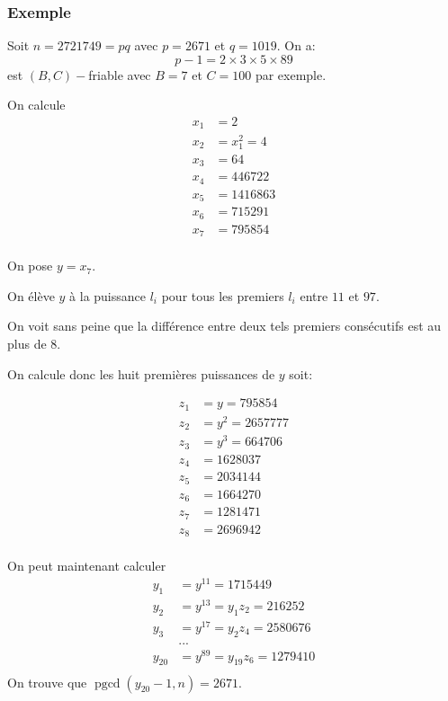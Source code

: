 \documentclass[french, 12pt, titlepage]{article}
\DeclareMathOperator{\pgcd}{pgcd}
\begin{document}
\subsubsection{Exemple}

Soit $n = 2721749 = pq$ avec $p = 2671$ et $q = 1019$. On a: \[p - 1 = 2 \times 3 \times 5 \times 89\] est $(B, C)-$friable avec $B = 7$ et $C = 100$ par exemple.

On calcule
\begin{align*}
  x_1 &= 2 \\
  x_2 &= x_1^2 = 4\\
  x_3 &= 64\\
  x_4 &= 446722\\ 
  x_5 &= 1416863\\
  x_6 &= 715291 \\
  x_7 &= 795854 \\
\end{align*}

On pose $y = x_7$.

On élève $y$ à la puissance $l_i$ pour tous les premiers $l_i$ entre $11$ et $97$.

On voit sans peine que la différence entre deux tels premiers consécutifs est au plus de $8.$

On calcule donc les huit premières puissances de $y$ soit:

\begin{align*}
  z_1 &= y = 795854\\
  z_2 &= y^2 = 2657777\\
  z_3 &= y^3 = 664706\\
  z_4 &= 1628037\\
  z_5 &= 2034144\\
  z_6 &= 1664270\\
  z_7 &= 1281471\\
  z_8 &= 2696942\\
\end{align*}

On peut maintenant calculer
\begin{align*}
  y_1 &= y^{11} = 1715449\\
  y_2 &= y^{13} = y_1 z_2 = 216252\\
  y_3 &= y^{17} = y_2 z_4 = 2580676\\
  & ... \\
  y_{20} &= y^{89} = y_{19} z_6 = 1279410\\
\end{align*}
On trouve que $ \pgcd (y_{20} - 1, n) = 2671.$
\end{document}
